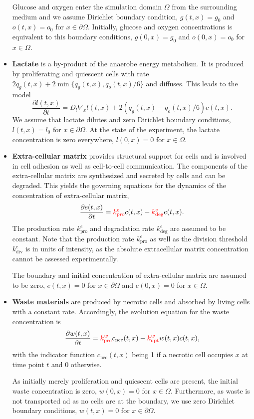 \documentclass[10pt,letterpaper]{article}
\begin{document}
\begin{itemize}
Glucose and oxygen enter the simulation domain $\Omega$ from the surrounding medium and we assume Dirichlet boundary condition, $g(t,x) = g_0$ and $o(t,x) = o_0$ for $x \in \partial\Omega$. Initially, glucose and oxygen concentrations is equivalent to this boundary conditions, $g(0,x) = g_0$ and $o(0,x) = o_0$ for $x \in \Omega$. 
%
\item \textbf{Lactate} is a by-product of the anaerobe energy metabolism. It is produced by proliferating and quiescent cells with rate $2 q_g(t,x) + 2 \min\{q_g(t,x), q_o(t,x)/6\}$ and diffuses. This leads to the model
\begin{equation*}
	\frac{\partial l(t,x)}{\partial t} = D_l \nabla_x l(t,x) + 2 \left( q_g(t,x) - q_o(t,x)/6\right) c(t,x).
\end{equation*}
We assume that lactate dilutes and zero Dirichlet boundary conditions, $l(t,x) = l_0$ for $x \in \partial\Omega$. At the state of the experiment, the lactate concentration is zero everywhere,  $l(0,x) = 0$ for $x \in \Omega$.
%
\item \textbf{Extra-cellular matrix} provides structural support for cells and is involved in cell adhesion as well as cell-to-cell communication. The components of the extra-cellular matrix are synthesized and secreted by cells and can be degraded. This yields the governing equations for the dynamics of the concentration of extra-cellular matrix,
\begin{equation*}
	\frac{\partial e(t,x)}{\partial t} = {\color{red}{k^{e}_{\text{pro}}}} c(t,x) - {\color{red}{k^{e}_{\text{deg}}}} e(t,x).
\end{equation*}
The production rate {\color{red}$k^{e}_{\text{pro}}$} and degradation rate {\color{red}$k^{e}_{\text{deg}}$} are assumed to be constant. Note that the production rate {\color{red}$k^{e}_{\text{pro}}$} as well as the division threshold {\color{red}$k^{e}_{\text{div}}$} is in units of intensity, as the absolute extracellular matrix concentration cannot be assessed experimentally.

The boundary and initial concentration of extra-cellular matrix are assumed to be zero, $e(t,x) = 0$ for $x \in \partial\Omega$ and $e(0,x) = 0$ for $x \in \Omega$.
%
\item \textbf{Waste materials} are produced by necrotic cells and absorbed by living cells with a constant rate. Accordingly, the evolution equation for the waste concentration is 
\begin{equation*}
	\frac{\partial w(t,x)}{\partial t} = {\color{red}{k^{w}_{\text{pro}}}} c_{\text{nec}}(t,x) - {\color{red}{k^{w}_{\text{upt}}}} w(t,x) c(t,x),
\end{equation*}
with the indicator function $c_{\text{nec}}(t,x)$ being 1 if a necrotic cell occupies $x$ at time point $t$ and 0 otherwise.

As initially merely proliferation and quiescent cells are present, the initial waste concentration is zero, $w(0,x) = 0$ for $x \in \Omega$. Furthermore, as waste is not transported ad as no cells are at the boundary, we use zero Dirichlet boundary conditions, $w(t,x) = 0$ for $x \in \partial\Omega$.
\end{itemize}
\end{document}
